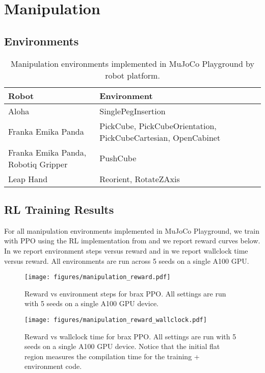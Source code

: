 \section{Manipulation}
\label{sec:appendix_manipulation}
\subsection{Environments}
\label{sec:appendix_manipulation_envs}

\begin{table*}[!ht]
\centering
\begin{tabular}{|l|p{10cm}|} %
\hline
\textbf{Robot}  & \textbf{Environment} \\ \hline
Aloha          & SinglePegInsertion \\ \hline
Franka Emika Panda &  PickCube, PickCubeOrientation, PickCubeCartesian, \mbox{OpenCabinet}  \\ \hline
Franka Emika Panda, Robotiq Gripper &  PushCube \\ \hline
Leap Hand & Reorient, RotateZAxis \\  \hline
\hline
\end{tabular}
\caption{Manipulation environments implemented in MuJoCo Playground by robot platform.}
\label{tab:manipulation_envs}
\end{table*}


\subsection{RL Training Results}
\label{sec:appendix_manipulation_curves}


For all manipulation environments implemented in MuJoCo Playground, we train with PPO using the RL implementation from \cite{freeman2021brax} and we report reward curves below. In  we report environment steps versus reward and in  we report wallclock time versus reward. All environments are run across 5 seeds on a single A100 GPU.

\begin{figure}[ht]
    \centering
    \texttt{[image: figures/manipulation\_reward.pdf]}
    \caption{\small Reward vs environment steps for brax PPO. All settings are run with 5 seeds on a single A100 GPU device.}
    \label{fig:manipulation_step_reward}
\end{figure}

\begin{figure}[ht]
    \centering
    \texttt{[image: figures/manipulation\_reward\_wallclock.pdf]}
    \caption{\small Reward vs wallclock time for brax PPO. All settings are run with 5 seeds on a single A100 GPU device. Notice that the initial flat region measures the compilation time for the training + environment code.}
    \label{fig:manipulation_time_reward}
\end{figure}

